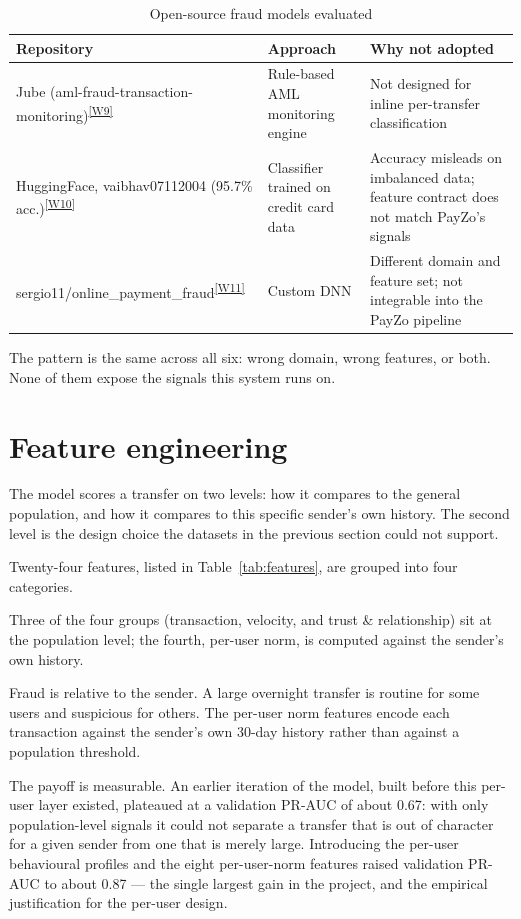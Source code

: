 \documentclass[12pt,a4paper]{report}
\newcommand{\webcite}[2]{\textsuperscript{\hyperref[#1]{[W#2]}}}
\begin{document}
\begin{table}[H]
\centering
\small
\renewcommand{\arraystretch}{1.2}
\begin{tabularx}{\linewidth}{|>{\raggedright\arraybackslash}p{4.0cm}|>{\raggedright\arraybackslash}p{2.8cm}|>{\raggedright\arraybackslash}X|}
\hline
\textbf{Repository} & \textbf{Approach} & \textbf{Why not adopted} \\
\hline
Jube (aml-fraud-transaction-monitoring)\webcite{web:jube}{9} & Rule-based AML monitoring engine & Not designed for inline per-transfer classification \\
\hline
HuggingFace, vaibhav07112004 (95.7\% acc.)\webcite{web:hf}{10} & Classifier trained on credit card data & Accuracy misleads on imbalanced data; feature contract does not match PayZo's signals \\
\hline
sergio11/\allowbreak online\_payment\_fraud\webcite{web:sergio}{11} & Custom DNN & Different domain and feature set; not integrable into the PayZo pipeline \\
\hline
\end{tabularx}
\caption{Open-source fraud models evaluated}
\label{tab:repos}
\end{table}

The pattern is the same across all six: wrong domain, wrong features, or both. None of them
expose the signals this system runs on.

\section{Feature engineering}

The model scores a transfer on two levels: how it compares to the general population, and how
it compares to this specific sender's own history. The second level is the design choice the
datasets in the previous section could not support.

Twenty-four features, listed in Table~\ref{tab:features}, are grouped into four categories.

Three of the four groups (transaction, velocity, and trust \& relationship) sit at the
population level; the fourth, per-user norm, is computed against the sender's own history.

Fraud is relative to the sender. A large overnight transfer is routine for some users and
suspicious for others. The per-user norm features encode each transaction against the sender's
own 30-day history rather than against a population threshold.

The payoff is measurable. An earlier iteration of the model, built before this per-user layer
existed, plateaued at a validation PR-AUC of about 0.67: with only population-level signals it
could not separate a transfer that is out of character for a given sender from one that is
merely large. Introducing the per-user behavioural profiles and the eight per-user-norm
features raised validation PR-AUC to about 0.87 --- the single largest
gain in the project, and the empirical justification for the per-user design.
\end{document}

